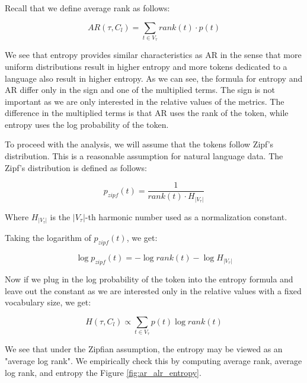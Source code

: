 Recall that we define average rank as follows:

\begin{equation}
    AR(\tau, C_l) = \sum_{t \in V_\tau} rank(t) \cdot p(t)
\end{equation}

We see that entropy provides similar characteristics as AR in the sense that more uniform distributions result in higher entropy and more tokens dedicated to a language also result in higher entropy. As we can see, the formula for entropy and AR differ only in the sign and one of the multiplied terms. The sign is not important as we are only interested in the relative values of the metrics. The difference in the multiplied terms is that AR uses the rank of the token, while entropy uses the log probability of the token. 

To proceed with the analysis, we will assume that the tokens follow Zipf's distribution. This is a reasonable assumption for natural language data. The Zipf's distribution is defined as follows:

\begin{equation}
    p_{zipf}(t) = \frac{1}{rank(t) \cdot H_{|V_\tau|}}
\end{equation}

Where $H_{|V_\tau|}$ is the $|V_\tau|$-th harmonic number used as a normalization constant.

Taking the logarithm of $p_{zipf}(t)$, we get:

\begin{equation}
    \log p_{zipf}(t) = - \log rank(t) - \log H_{|V_\tau|}
\end{equation}

Now if we plug in the log probability of the token into the entropy formula and leave out the constant as we are interested only in the relative values with a fixed vocabulary size, we get:

\begin{equation}
    H(\tau, C_l) \propto \sum_{t \in V_\tau} p(t) \log rank(t)
\end{equation}

We see that under the Zipfian assumption, the entropy may be viewed as an "average log rank". We empirically check this by computing average rank, average log rank, and entropy the Figure \ref{fig:ar_alr_entropy}.

